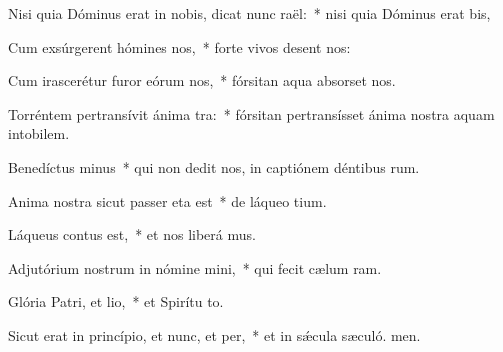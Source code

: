 \item Nisi quia Dóminus erat in nobis, dicat nunc raël:~* nisi quia Dóminus erat  bis,
\item Cum exsúrgerent hómines  nos,~* forte vivos desent nos:
\item Cum irascerétur furor eórum  nos,~* fórsitan aqua absorset nos.
\item Torréntem pertransívit ánima tra:~* fórsitan pertransísset ánima nostra aquam intobilem.
\item Benedíctus minus~* qui non dedit nos, in captiónem déntibus rum.
\item Anima nostra sicut passer eta est~* de láqueo tium.
\item Láqueus contus est,~* et nos liberá mus.
\item Adjutórium nostrum in nómine mini,~* qui fecit cælum  ram.
\item Glória Patri, et lio,~* et Spirítu to.
\item Sicut erat in princípio, et nunc, et per,~* et in sǽcula sæculó. men.
